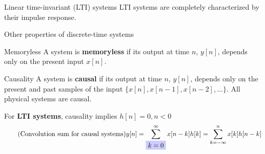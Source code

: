 \documentclass[10pt]{beamer}
\begin{document}
%
\begin{frame}[t]{Linear time-invariant (LTI) systems}
LTI systems are completely characterized by their impulse response.

\begin{figure}
	\centering
	\vspace{-0.25cm}
	\resizebox{0.9\linewidth}{!}{}
	\label{fig:DTimp}
\end{figure}
\vspace{-0.5cm}

\end{frame}

\begin{frame}{Other properties of discrete-time systems}

\begin{block}{Memoryless}
	A system is \textbf{memoryless} if its output at time $n$, $y[n]$,  depends only on the present input $x[n]$.
\end{block}

\begin{block}{Causality}
	A system is \textbf{causal} if its output at time $n$, $y[n]$, depends only on the present and past samples of the input $\{x[n], x[n-1], x[n-2], \ldots\}$. All physical systems are causal.
	\vspace{0.5cm}
	
	For \textbf{LTI systems}, causality implies $h[n] = 0, n < 0$
	\begin{equation*}\tag{Convolution sum for causal systems}
	y[n] = \sum_{\tikz[baseline]{
			\node[fill=blue!20,anchor=base] (t1) {$k=0$};}}^{\infty} x[n-k]h[k] = \sum_{k=-\infty}^{n} x[k]h[n-k]
	\end{equation*}
	
\end{block}

\end{frame}
\end{document}
